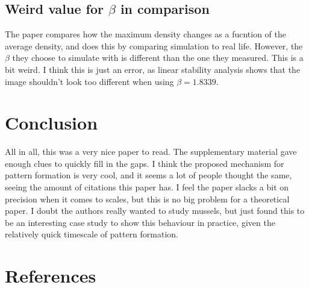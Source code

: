 \documentclass[a4paper]{jpconf}
\begin{document}
\subsection*{Weird value for $\beta$ in comparison}
The paper compares how the maximum density changes as a fucntion of the average density, and does this by comparing simulation to real life. However, the $\beta$ they choose to simulate with is different than the one they measured. This is a bit weird. I think this is just an error, as linear stability analysis shows that the image shouldn't look too different when using $\beta = 1.8339$. 
\section{Conclusion}
All in all, this was a very nice paper to read. The supplementary material gave enough clues to quickly fill in the gaps. I think the proposed mechanism for pattern formation is very cool, and it seems a lot of people thought the same, seeing the amount of citations this paper has. I feel the paper slacks a bit on precision when it comes to scales, but this is no big problem for a theoretical paper. I doubt the authors really wanted to study mussels, but just found this to be an interesting case study to show this behaviour in practice, given the relatively quick timescale of pattern formation. 

\section*{References}


\end{document}
